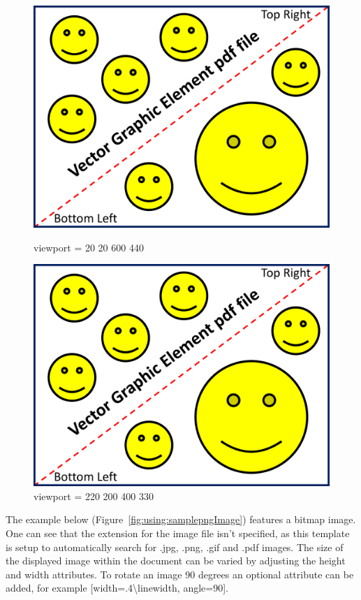 \begin{figure}[H]
\begin{minipage}[t]{7.4cm}
\begin{center}
\includegraphics*[viewport= 20 20 600 440, width=.8\linewidth]{resources/VectorGraphicElementPDF.pdf}
\caption{viewport = 20 20 600 440}
\label{fig:using:Example1}
\end{center}
\end{minipage}
\hfill
\begin{minipage}[t]{7.4cm}
\begin{center}
\includegraphics*[viewport= 220 200 400 330, width=.8\linewidth]{resources/VectorGraphicElementPDF.pdf}
\caption{viewport = 220 200 400 330}
\label{fig:using:Example2}
\end{center}
\end{minipage}
\end{figure}

The example below (Figure~\ref{fig:using:samplepngImage}) features a bitmap image. One can see that the extension for the image file isn't specified, as this template is setup to automatically search for .jpg, .png, .gif and .pdf images. The size of the displayed image within the document can be varied by adjusting the height and width attributes. To rotate an image 90 degrees an optional attribute can be added, for example [width=.4\textbackslash linewidth, angle=90].

